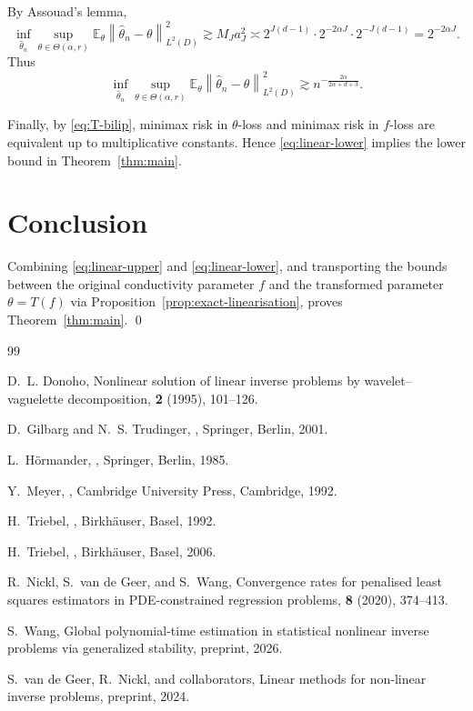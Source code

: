 \documentclass[11pt]{article}
\newcommand{\E}{\mathbb E}
\newcommand{\1}{\mathbf 1}
\newcommand{\norm}[1]{\left\|#1\right\|}
\begin{document}
By Assouad's lemma,
\[
\inf_{\widehat\theta_n}\sup_{\theta\in\Theta(\alpha,r)}
\E_\theta\norm{\widehat\theta_n-\theta}_{L^2(D)}^2
\gtrsim
M_J a_J^2
\asymp
2^{J(d-1)}\cdot 2^{-2\alpha J}\cdot 2^{-J(d-1)}
=
2^{-2\alpha J}.
\]
Thus
\begin{equation}\label{eq:linear-lower}
\inf_{\widehat\theta_n}\sup_{\theta\in\Theta(\alpha,r)}
\E_\theta\norm{\widehat\theta_n-\theta}_{L^2(D)}^2
\gtrsim
n^{-\frac{2\alpha}{2\alpha+d+3}}.
\end{equation}

Finally, by \eqref{eq:T-bilip}, minimax risk in $\theta$-loss and minimax risk in $f$-loss are equivalent up to multiplicative constants. Hence \eqref{eq:linear-lower} implies the lower bound in Theorem~\ref{thm:main}.

\section{Conclusion}

Combining \eqref{eq:linear-upper} and \eqref{eq:linear-lower}, and transporting the bounds between the original conductivity parameter $f$ and the transformed parameter $\theta=T(f)$ via Proposition~\ref{prop:exact-linearisation}, proves Theorem~\ref{thm:main}. \qed

\bigskip

\begin{thebibliography}{99}

D.~L. Donoho,
\newblock Nonlinear solution of linear inverse problems by wavelet--vaguelette decomposition,
 {\bf 2} (1995), 101--126.

D.~Gilbarg and N.~S. Trudinger,
,
\newblock Springer, Berlin, 2001.

L.~H\"ormander,
,
\newblock Springer, Berlin, 1985.

Y.~Meyer,
,
\newblock Cambridge University Press, Cambridge, 1992.

H.~Triebel,
,
\newblock Birkh\"auser, Basel, 1992.

H.~Triebel,
,
\newblock Birkh\"auser, Basel, 2006.

R.~Nickl, S.~van de Geer, and S.~Wang,
\newblock Convergence rates for penalised least squares estimators in PDE-constrained regression problems,
 {\bf 8} (2020), 374--413.

S.~Wang,
\newblock Global polynomial-time estimation in statistical nonlinear inverse problems via generalized stability,
\newblock preprint, 2026.

S.~van de Geer, R.~Nickl, and collaborators,
\newblock Linear methods for non-linear inverse problems,
\newblock preprint, 2024.

\end{thebibliography}
\end{document}
